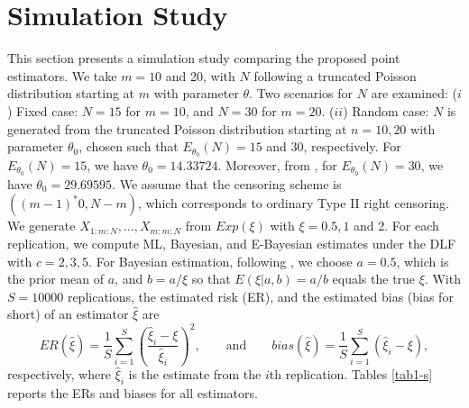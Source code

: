 \documentclass[twoside]{article}
\begin{document}
\section{Simulation Study}	
This section presents a simulation study comparing the proposed point estimators. We take $m=10$ and 20, with $N$ following a truncated Poisson distribution starting at $m$ with parameter $\theta$. Two scenarios for \( N \) are examined:
($i$) {Fixed case:} $ N = 15 $ for $ m = 10 $, and $ N = 30 $ for $ m = 20$. 
($ii$) {Random case:} $ N $ is generated from the truncated Poisson distribution starting at $ n = 10, 20 $ with parameter $ \theta_0 $, chosen such that $ E_{\theta_0}(N) = 15 $ and $ 30 $, respectively. For  $ E_{\theta_0}(N) = 15 $, we have $ \theta_0 = 14.33724 $. Moreover, from \cite{Ghasabani:et:al:2026}, for $ E_{\theta_0}(N) = 30 $, we have $ \theta_0 = 29.69595 $. 
We assume that the censoring scheme is $((m-1)^*0, N-m)$, which corresponds to ordinary Type II right censoring. We generate $X_{1:m:N},\ldots,X_{m:m:N}$ from $Exp(\xi)$ with $\xi=0.5,1$ and 2. For each replication, we compute ML, Bayesian, and E-Bayesian estimates under the DLF with $c=2,3,5$.
For Bayesian estimation, following \cite{Ghasabani:et:al:2026}, we choose $a=0.5$, which is the prior mean of $a$, and $b=a/\xi$ so that $E(\xi|a,b)=a/b$ equals the true $\xi$. With $S=10000$ replications, the estimated risk (ER), and the estimated bias (bias for short) of an estimator $\hat{\xi}$ are
\[
ER(\hat{\xi})=\frac{1}{S}\sum_{i=1}^S \left(\frac{\hat{\xi}_i-\xi}{\hat{\xi}_i}\right)^2,\quad\quad\text{and}\quad\quad bias(\hat{\xi})=\frac{1}{S}\sum_{i=1}^S \left(\hat{\xi}_i-\xi\right),
\]
respectively, where $\hat{\xi}_i$ is the estimate from the $i$th replication. 
Tables \ref{tab1-s}   reports the ERs and biases for all estimators. 
\end{document}
